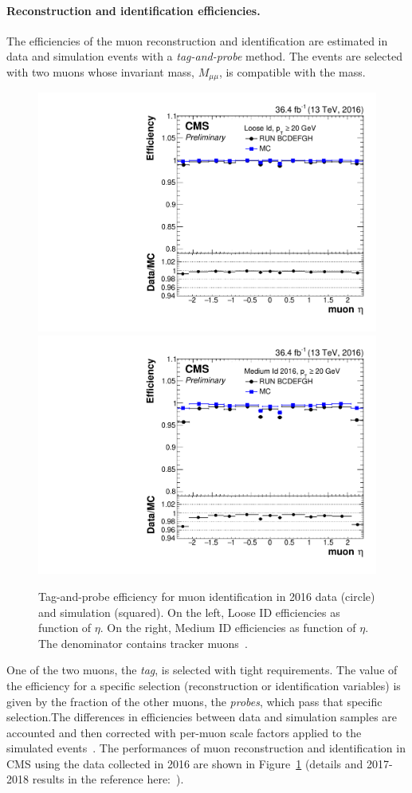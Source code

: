 \paragraph{Reconstruction and identification
  efficiencies.}\label{sec:c2effmuon}

The efficiencies of the muon reconstruction and identification are
estimated in data and simulation events with a \emph{tag-and-probe}
method. The events are selected with two muons whose invariant mass,
$M_{\mu \mu}$, is compatible with the \PZ mass. 
\begin{figure}[h!]
\centering
\includegraphics[width=.48\textwidth]{Figures/c2/TnP_MC_NUM_LooseID_DEN_genTracks_PAR_eta_.pdf}
\includegraphics[width=.48\textwidth]{Figures/c2/TnP_MC_NUM_MediumID2016_DEN_genTracks_PAR_eta_.pdf}
\caption{Tag-and-probe efficiency for muon identification in 2016 data
  (circle) and simulation (squared). On the left, Loose ID efficiencies as function of $\eta$. 
On the right, Medium ID efficiencies as function of $\eta$. The
  denominator contains tracker muons~\cite{CMS-DP-2017-007}.}
\label{fig:2016eff}
\end{figure}
One of the two muons,
the \emph{tag}, is selected with tight requirements. The value of the
efficiency for a specific selection (reconstruction or identification
variables) is given by the fraction of the other muons, the
\emph{probes}, which pass that specific selection.The differences in
efficiencies between data and simulation samples are accounted and
then corrected with per-muon scale factors applied to the simulated
events~\cite{Sirunyan_2018_muon}. The performances of muon
reconstruction and identification in CMS using the data collected in
2016 are shown in Figure~\ref{fig:2016eff} (details and 2017-2018
results in the reference
here:~\cite{CMS-DP-2017-007,CMS-DP-2018-042}).

